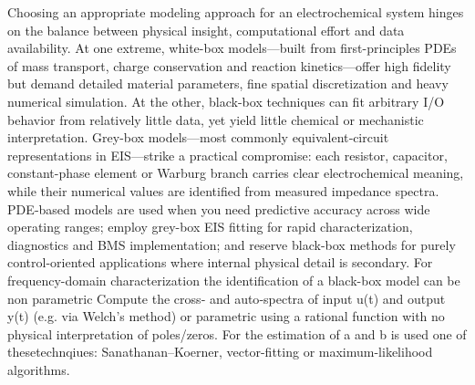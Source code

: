 Choosing an appropriate modeling approach for an electrochemical system hinges on the balance between physical insight, computational effort and data availability.  At one extreme, white-box models—built from first-principles PDEs of mass transport, charge conservation and reaction kinetics—offer high fidelity but demand detailed material parameters, fine spatial discretization and heavy numerical simulation.  At the other, black-box techniques can fit arbitrary I/O behavior from relatively little data, yet yield little chemical or mechanistic interpretation.  Grey-box models—most commonly equivalent‐circuit representations in EIS—strike a practical compromise: each resistor, capacitor, constant-phase element or Warburg branch carries clear electrochemical meaning, while their numerical values are identified from measured impedance spectra.  PDE‐based models are used when you need predictive accuracy across wide operating ranges; employ grey-box EIS fitting for rapid characterization, diagnostics and BMS implementation; and reserve black-box methods for purely control-oriented applications where internal physical detail is secondary.
For frequency-domain characterization the identification of a black-box model can be non parametric Compute the cross‐ and auto‐spectra of input u(t) and output y(t) (e.g. via Welch’s method) or parametric using a rational function with no physical interpretation of poles/zeros. For the estimation of a and b is used one of thesetechnqiues:  Sanathanan–Koerner, vector-fitting or maximum-likelihood algorithms.
